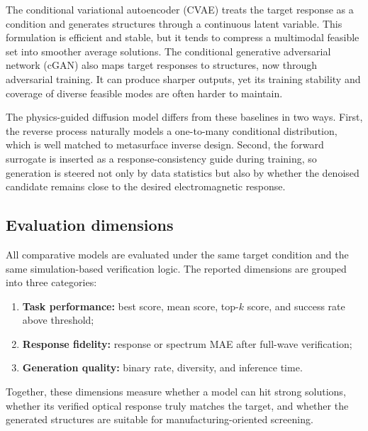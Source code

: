 \documentclass[10pt,a4paper]{article}
\begin{document}
The conditional variational autoencoder (CVAE) treats the target response as a condition and generates structures through a continuous latent variable. This formulation is efficient and stable, but it tends to compress a multimodal feasible set into smoother average solutions. The conditional generative adversarial network (cGAN) also maps target responses to structures, now through adversarial training. It can produce sharper outputs, yet its training stability and coverage of diverse feasible modes are often harder to maintain.

The physics-guided diffusion model differs from these baselines in two ways. First, the reverse process naturally models a one-to-many conditional distribution, which is well matched to metasurface inverse design. Second, the forward surrogate is inserted as a response-consistency guide during training, so generation is steered not only by data statistics but also by whether the denoised candidate remains close to the desired electromagnetic response.

\subsection{Evaluation dimensions}

All comparative models are evaluated under the same target condition and the same simulation-based verification logic. The reported dimensions are grouped into three categories:
\begin{enumerate}[leftmargin=1.5em]
\item \textbf{Task performance:} best score, mean score, top-$k$ score, and success rate above threshold;
\item \textbf{Response fidelity:} response or spectrum MAE after full-wave verification;
\item \textbf{Generation quality:} binary rate, diversity, and inference time.
\end{enumerate}
Together, these dimensions measure whether a model can hit strong solutions, whether its verified optical response truly matches the target, and whether the generated structures are suitable for manufacturing-oriented screening.
\end{document}
